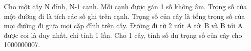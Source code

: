 Cho một cây N đỉnh, N-1 cạnh. Mỗi cạnh được gán 1 số không âm. Trọng số của một đường đi là tích các số ghi trên cạnh. Trọng số của cây là tổng trọng số của mọi đường đi giữa mọi cặp đỉnh trên cây. Đường đi từ 2 nút A tới B và B tới A được coi là duy nhất, chỉ tính 1 lần. Cho 1 cây, tính số dư trọng số của cây cho 1000000007.